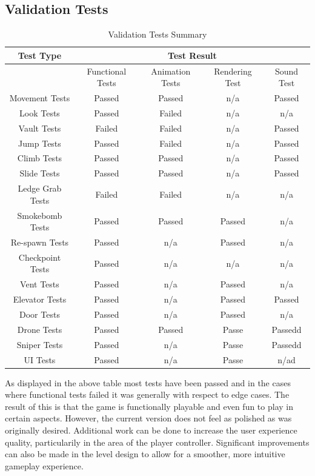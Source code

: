 \documentclass[11pt,a4paper]{article}
\begin{document}
\subsection{Validation Tests}
\begin{table}[H]
	\caption{Validation Tests Summary}
	\begin{center}
		\begin{tabular}{ |c|c|c|c|c| } 
			\hline
			Test Type & \multicolumn{4}{|c|}{Test Result}\\ \hline
			& Functional Tests & Animation Tests & Rendering Test & Sound Test\\ \hline
			Movement Tests & Passed & Passed & n/a & Passed\\ \hline
			Look Tests & Passed & Failed & n/a& n/a\\ \hline
			Vault Tests & Failed & Failed & n/a& Passed\\ \hline
			Jump Tests & Passed & Failed & n/a& Passed\\ \hline
			Climb Tests & Passed & Passed & n/a& Passed\\ \hline
			Slide Tests & Passed & Passed & n/a& Passed\\ \hline
			Ledge Grab Tests & Failed & Failed & n/a& n/a\\ \hline
			Smokebomb Tests & Passed & Passed & Passed& n/a\\ \hline
			Re-spawn Tests & Passed & n/a & Passed& n/a\\ \hline
			Checkpoint Tests & Passed & n/a & n/a& n/a\\ \hline
			Vent Tests & Passed & n/a & Passed& n/a\\ \hline
			Elevator Tests & Passed & n/a & Passed& Passed\\ \hline
			Door Tests & Passed & n/a & Passed& n/a\\ \hline
			Drone Tests & Passed & Passed & Passe& Passedd\\ \hline
			Sniper Tests & Passed & n/a & Passe& Passedd\\ \hline
			UI Tests & Passed & n/a & Passe& n/ad\\ \hline
		\end{tabular}
	\end{center}
\end{table}
As displayed in the above table most tests have been passed and in the cases where functional tests failed it was generally with respect to edge cases. The result of this is that the game is functionally playable and even fun to play in certain aspects. However, the current version does not feel as polished as was originally desired. Additional work can be done to increase the user experience quality, particularily in the area of the player controller. Significant improvements can also be made in the level design to allow for a smoother, more intuitive gameplay experience.
\end{document}
